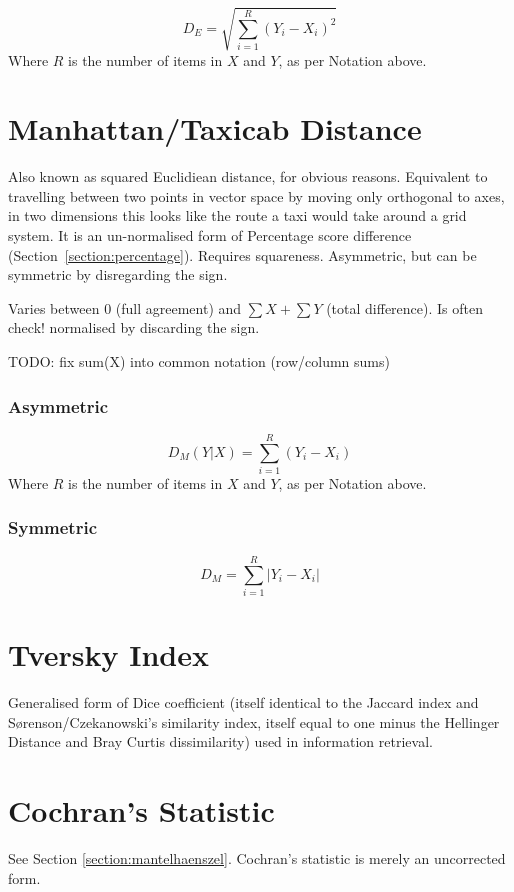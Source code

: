 \documentclass[11pt]{article}
\begin{document}
$$
D_E = \sqrt{ \sum_{i=1}^{R}{ (Y_i - X_i)^2 } }
$$
Where $R$ is the number of items in $X$ and $Y$, as per Notation above.



\section{Manhattan/Taxicab Distance}
\label{section:manhattan}
Also known as squared Euclidiean distance, for obvious reasons.  Equivalent to travelling between two points in vector space by moving only orthogonal to axes, in two dimensions this looks like the route a taxi would take around a grid system.  It is an un-normalised form of Percentage score difference (Section~\ref{section:percentage}).  Requires squareness.  Asymmetric, but can be symmetric by disregarding the sign.
 
Varies between 0 (full agreement) and $\sum{X} + \sum{Y}$ (total difference). Is often {\color{red}  check!} normalised by discarding the sign.

{\color{red} TODO: fix sum(X) into common notation (row/column sums)}
\subsubsection{Asymmetric}
$$
D_M(Y|X) = \sum_{i=1}^{R}{ (Y_i - X_i) }
$$
Where $R$ is the number of items in $X$ and $Y$, as per Notation above.

\subsubsection{Symmetric}
$$
D_M = \sum_{i=1}^{R}{ |Y_i - X_i| }
$$




\section{Tversky Index}
Generalised form of Dice coefficient (itself identical to the Jaccard index and S\o renson/Czekanowski's similarity index, itself equal to one minus the Hellinger Distance and Bray Curtis dissimilarity) used in information retrieval.



\section{Cochran's Statistic}
See Section \ref{section:mantelhaenszel}.  Cochran's statistic is merely an uncorrected form.
\end{document}
